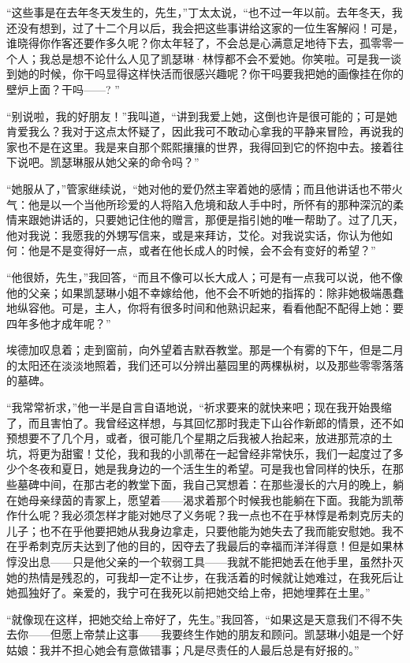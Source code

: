 \par “这些事是在去年冬天发生的，先生，”丁太太说，“也不过一年以前。去年冬天，我还没有想到，过了十二个月以后，我会把这些事讲给这家的一位生客解闷！可是，谁晓得你作客还要作多久呢？你太年轻了，不会总是心满意足地待下去，孤零零一个人；我总是想不论什么人见了凯瑟琳·林惇都不会不爱她。你笑啦。可是我一谈到她的时候，你干吗显得这样快活而很感兴趣呢？你干吗要我把她的画像挂在你的壁炉上面？干吗——? ”
\par “别说啦，我的好朋友！”我叫道，“讲到我爱上她，这倒也许是很可能的；可是她肯爱我么？我对于这点太怀疑了，因此我可不敢动心拿我的平静来冒险，再说我的家也不是在这里。我是来自那个熙熙攘攘的世界，我得回到它的怀抱中去。接着往下说吧。凯瑟琳服从她父亲的命令吗？”
\par “她服从了，”管家继续说，“她对他的爱仍然主宰着她的感情；而且他讲话也不带火气：他是以一个当他所珍爱的人将陷入危境和敌人手中时，所怀有的那种深沉的柔情来跟她讲话的，只要她记住他的赠言，那便是指引她的唯一帮助了。过了几天，他对我说：我愿我的外甥写信来，或是来拜访，艾伦。对我说实话，你认为他如何：他是不是变得好一点，或者在他长成人的时候，会不会有变好的希望？”
\par “他很娇，先生，”我回答，“而且不像可以长大成人；可是有一点我可以说，他不像他的父亲；如果凯瑟琳小姐不幸嫁给他，他不会不听她的指挥的：除非她极端愚蠢地纵容他。可是，主人，你将有很多时间和他熟识起来，看看他配不配得上她：要四年多他才成年呢？”
\par 埃德加叹息着；走到窗前，向外望着吉默吞教堂。那是一个有雾的下午，但是二月的太阳还在淡淡地照着，我们还可以分辨出墓园里的两棵枞树，以及那些零零落落的墓碑。
\par “我常常祈求，”他一半是自言自语地说，“祈求要来的就快来吧；现在我开始畏缩了，而且害怕了。我曾经这样想，与其回忆那时我走下山谷作新郎的情景，还不如预想要不了几个月，或者，很可能几个星期之后我被人抬起来，放进那荒凉的土坑，将更为甜蜜！艾伦，我和我的小凯蒂在一起曾经非常快乐，我们一起度过了多少个冬夜和夏日，她是我身边的一个活生生的希望。可是我也曾同样的快乐，在那些墓碑中间，在那古老的教堂下面，我自己冥想着：在那些漫长的六月的晚上，躺在她母亲绿茵的青冢上，愿望着——渴求着那个时候我也能躺在下面。我能为凯蒂作什么呢？我必须怎样才能对她尽了义务呢？我一点也不在乎林惇是希刺克厉夫的儿子；也不在乎他要把她从我身边拿走，只要他能为她失去了我而能安慰她。我不在乎希刺克厉夫达到了他的目的，因夺去了我最后的幸福而洋洋得意！但是如果林惇没出息——只是他父亲的一个软弱工具——我就不能把她丢在他手里，虽然扑灭她的热情是残忍的，可我却一定不让步，在我活着的时候就让她难过，在我死后让她孤独好了。亲爱的，我宁可在我死以前把她交给上帝，把她埋葬在土里。”
\par “就像现在这样，把她交给上帝好了，先生。”我回答，“如果这是天意我们不得不失去你——但愿上帝禁止这事——我要终生作她的朋友和顾问。凯瑟琳小姐是一个好姑娘：我并不担心她会有意做错事；凡是尽责任的人最后总是有好报的。”

